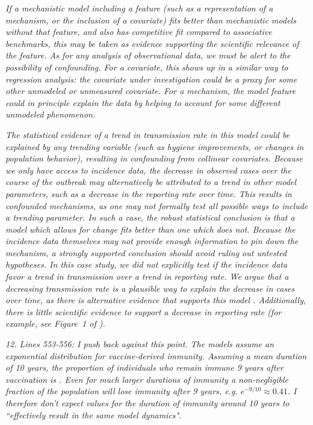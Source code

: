 \documentclass[11pt]{article}
\newcommand\report[1]{{\color{mygreen} \vspace{1mm}\hspace{0.25in}\parbox{6in}{\em #1}}}
\newcommand\article[1]{{\color{blue} \vspace{1mm}\hspace{0.25in}\parbox{6in}{\em #1}}}
\begin{document}
\article{If a mechanistic model including a feature (such as a representation of a mechanism, or the inclusion of a covariate) fits better than mechanistic models without that feature, and also has competitive fit compared to associative benchmarks, this may be taken as evidence supporting the scientific relevance of the feature.
As for any analysis of observational data, we must be alert to the possibility of confounding.
For a covariate, this shows up in a similar way to regression analysis: the covariate under investigation could be a proxy for some other unmodeled or unmeasured covariate.
For a mechanism, the model feature could in principle explain the data by helping to account for some different unmodeled phenomenon.} 

\article{The statistical evidence of a trend in transmission rate in this model could be explained by any trending variable (such as hygiene improvements, or changes in population behavior), resulting in confounding from collinear covariates. Because we only have access to incidence data, the decrease in observed cases over the course of the outbreak may alternatively be attributed to a trend in other model parameters, such as a decrease in the reporting rate over time.
This results in confounded mechanisms, as one may not formally test all possible ways to include a trending parameter. In such a case, the robust statistical conclusion is that a model which allows for change fits better than one which does not. Because the incidence data themselves may not provide enough information to pin down the mechanism, a strongly supported conclusion should avoid ruling out untested hypotheses. In this case study, we did not explicitly test if the incidence data favor a trend in transmission over a trend in reporting rate. We argue that a decreasing transmission rate is a plausible way to explain the decrease in cases over time, as there is alternative evidence that supports this model \cite{rebaudet19CATI,rebaudet21,michel19}. Additionally, there is little scientific evidence to support a decrease in reporting rate (for example, see Figure~1 of \cite{rebaudet21}).}

\report{12.
  Lines 553-556: I push back against this point. The models assume an exponential distribution for vaccine-derived immunity. Assuming a mean duration of 10 years, the proportion of individuals who remain immune 9 years after vaccination is . Even for much larger durations of immunity a non-negligible fraction of the population will lose immunity after 9 years, e.g. $e^{-9/10}\approx 0.41$. I therefore don't expect values for the duration of immunity around 10 years to ``effectively result in the same model dynamics".
}
\end{document}
